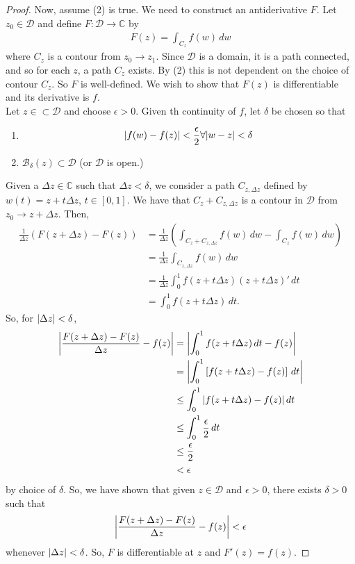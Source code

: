 \documentclass{article}
\theoremstyle{definition}
\newcommand{\f}[2]{\frac{#1}{#2}}
\newcommand{\C}{\mathbb{C}}
\newcommand{\B}{\mathcal{B}}
\newcommand{\lp}{\left(}
\newcommand{\rp}{\right)}
\newcommand{\lb}{\left[}
\newcommand{\rb}{\right]}
\newcommand{\nn}{\nonumber}
\begin{document}
\begin{proof}
	
	Now, assume (2) is true. We need to construct an antiderivative $F$. Let $z_0 \in \mathcal{D}$ and define $F: \mathcal{D} \to \C$ by
	\begin{align}
	F(z) = \int_{C_z}f(w)\,dw
	\end{align}
	where $C_z$ is a contour  from $z_0 \to z_1$. Since $\mathcal{D}$ is a domain, it is a path connected, and so for each $z$, a path $C_z$ exists. By (2) this is not dependent on the choice of contour $C_z$. So $F$ is well-defined. We wish to show that $F(z)$ is differentiable and its derivative is $f$. \\
	
	Let $z \in \subset \mathcal{D}$ and choose $\epsilon > 0$. Given th continuity of $f$, let $\delta$ be chosen so that 
	\begin{enumerate}
		\item \begin{align}
		\abs{f(w) - f(z)} < \f{\epsilon}{2} \forall \abs{w-z} < \delta
		\end{align}
		
		\item $\B_\delta(z) \subset \mathcal{D}$ (or $\mathcal{D}$ is open.)
	\end{enumerate}
	
	Given a $\Delta z \in \C$ such that $\Delta z < \delta$, we consider a path $C_{z,\Delta z}$ defined by $w(t) = z + t\Delta z$, $t \in  [0,1]$. We have that $C_z + C_{z,\Delta z}$ is a contour in $\mathcal{D}$ from $z_0 \to z + \Delta z$. Then,
	\begin{align}
	\f{1}{\Delta z} \lp F(z+ \Delta z) - F(z) \rp &= \f{1}{\Delta z}\lp \int_{C_z + C_{z,\Delta z}} f(w)\,dw - \int_{C_z}f(w)\,dw \rp\nn\\
	&= \f{1}{\Delta z}\int_{C_{z,\Delta z}} f(w)\,dw\nn\\
	&= \f{1}{\Delta z}\int^1_0 f(z+t\Delta z)(z + t\Delta z)'\,dt\nn\\
	&= \int^1_0 f(z+t\Delta z)\,dt.
	\end{align}
	So, for $\abs{\Delta z} < \delta$,
	\begin{align}
	\abs{\f{F(z+\Delta z) - F(z)}{\Delta z} - f(z)} &= \abs{ \int^1_0 f(z+t\Delta z)\,dt - f(z)}\nn\\
	&= \abs{\int^1_0 \lb f(z+t\Delta z) - f(z)  \rb\,dt }\nn\\
	&\leq \int^1_0 \abs{f(z+t\Delta z) - f(z)}\,dt\nn\\
	&\leq \int^1_0 \f{\epsilon}{2}\,dt\nn\\
	&\leq \f{\epsilon}{2}\nn\\
	&< \epsilon
	\end{align}
	by choice of $\delta$. So, we have shown that given $z\in \mathcal{D}$ and $\epsilon > 0$, there exists $\delta > 0$ such that
	\begin{align}
	\abs{\f{F(z + \Delta z) - F(z)}{\Delta z} - f(z)} < \epsilon
	\end{align}
	whenever $\abs{\Delta z} < \delta$. So, $F$ is differentiable at $z$ and $F'(z) = f(z)$.
\end{proof} 
\end{document}
